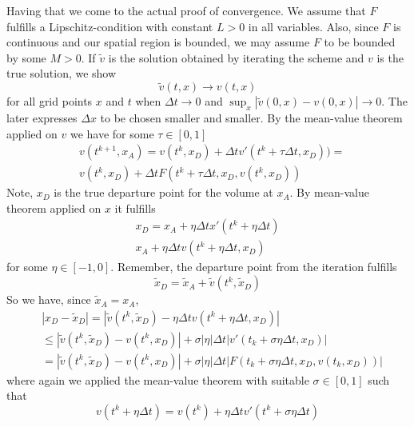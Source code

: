 \documentclass[17pt]{extarticle}
\begin{document}
Having that we come to the actual proof of convergence.
We assume that $F$ fulfills a Lipschitz-condition with constant $L>0$ in all variables.
Also, since $F$ is continuous and our spatial region is bounded, we may assume $F$ to be bounded by some $M>0$.
If $\tilde{v}$ is the solution obtained by iterating the scheme and $v$ is the true solution, we show
$$
\tilde{v}(t, x)\rightarrow v(t,x)
$$
for all grid points $x$ and $t$ when $\Delta t\rightarrow 0$ and $\sup_x|\tilde{v}(0, x)-v(0,x)| \rightarrow 0$. The later expresses $\Delta x$ to be chosen smaller and smaller.
By the mean-value theorem applied on $v$ we have for some $\tau\in [0,1]$
\begin{align} \label{mean_value_v}
	&v(t^{k+1}, x_A)=v(t^k, x_D)+\Delta t v'(t^k+\tau\Delta t, x_D))= \nonumber \\ 
	&v(t^k, x_D)+\Delta t  F(t^k+\tau\Delta t, x_D, v(t^k, x_D))
\end{align}
Note, $x_D$ is the true departure point for the volume at $x_A$. By mean-value theorem applied on $x$ it fulfills
\begin{align} \label{mean_value_x}
	x_D=x_A+\eta\Delta t x'(t^k+\eta\Delta t) \nonumber \\
	x_A+\eta\Delta t v(t^k+\eta\Delta t, x_D)
\end{align}
for some $\eta\in [-1, 0]$.
Remember, the departure point from the iteration fulfills
$$
\tilde{x}_D=\tilde{x}_A+\tilde{v}(t^k, \tilde{x}_D)
$$
So we have, since $\tilde{x}_A=x_A$,
\begin{align} \label{estimate_x_Ds}
&|x_D-\tilde{x}_D|=|\tilde{v}(t^k, \tilde{x}_D)-\eta\Delta t v(t^k+\eta\Delta t, x_D)|\\ \nonumber
&	\leq |\tilde{v}(t^k, \tilde{x}_D)-v(t^k, x_D)|+\sigma|\eta|\Delta t|v'(t_k+\sigma\eta\Delta t, x_D)|\\ \nonumber
&=|\tilde{v}(t^k, \tilde{x}_D)-v(t^k, x_D)|+\sigma|\eta|\Delta t|F(t_k+\sigma\eta\Delta t, x_D, v(t_k, x_D))|
\end{align}
where again we applied the mean-value theorem with suitable $\sigma\in [0,1]$
such that
$$
v(t^{k}+\eta\Delta t)=v(t^k)+\eta\Delta t v'(t^k+\sigma\eta\Delta t)
$$
\end{document}
